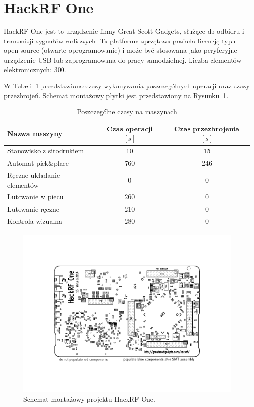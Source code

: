 \newpage
\section{HackRF One}
HackRF One jest to urządzenie firmy Great Scott Gadgets, służące do odbioru i transmisji sygnałów radiowych. Ta platforma sprzętowa posiada licencję typu open-source (otwarte oprogramowanie) i może być stosowana jako peryferyjne urządzenie USB lub zaprogramowana do pracy samodzielnej.
Liczba elementów elektronicznych: 300.

\breakparagraph{}
W Tabeli~\ref{hackrf:tab} przedstawiono czasy wykonywania poszczególnych operacji oraz czasy przezbrojeń. Schemat montażowy płytki jest przedstawiony na Rysunku~\ref{hackrf:sche}.

\begin{table}[H]
	\centering
	\caption{Poszczególne czasy na maszynach}
	\begin{tabular}{lcc}
		\toprule
		Nazwa maszyny                 & Czas operacji $[s]$ & Czas przezbrojenia $[s]$ \\
		\midrule
		Stanowisko z sitodrukiem      & 10                  & 15                       \\
		Automat pick\&place           & 760                 & 246                      \\
		Ręczne układanie elementów & 0                   & 0                        \\
		Lutowanie w piecu             & 260                 & 0                        \\
		Lutowanie ręczne             & 210                 & 0                        \\
		Kontrola wizualna             & 280                 & 0                        \\
		\bottomrule
	\end{tabular}
	\label{hackrf:tab}
\end{table}

\begin{figure}[H]
	\centering
	\includegraphics[clip, trim=1.5cm 2.5cm 1.5cm 2.5cm]{chapters/chapter5/hackrf-one-assembly.pdf}
	\caption{Schemat montażowy projektu HackRF One.}
	\label{hackrf:sche}
\end{figure}


